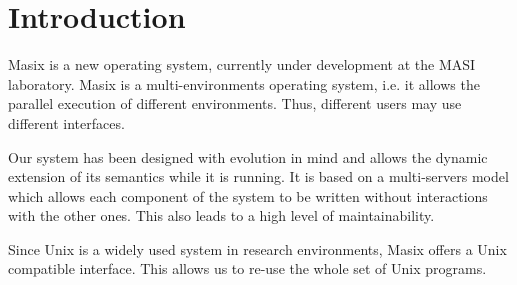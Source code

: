 \begin {abstract}

	Traditional operating systems have been designed as a monolithic
kernel implementing the whole set of the system services. This approach leads
to important maintenance end evolution problems. This paper discusses a new
design methodology. The operating system is implemented as a set of servers
using the services provided by a micro-kernel. Splitting up the operating
system into a set of servers leads to a modular and evolutive structure. The
system exposed in this paper is made up of three layers. The first one, the
host system, provides services which allow the dynamic inclusion of new servers
and different user interfaces. The second one, the Unix environment, contains
a set of servers which provide Unix abstractions and semantics. It is based
on new and optimized implementations, using the Mach micro-kernel facilities.
The third layer, the virtual system, is made up of a set of servers providing
distributed features. These servers are dynamically included in the system by
using the host system services. Numerous improvements included in the system
imply performance optimizations in spite of context switches and messages
exchanges needed to make different servers communicate with each others. The
resulting structure is innovative and easy to extend. This system is the basis
for future distributed operating system researches.

\end {abstract}

\section* {Introduction}

	Masix is a new operating system, currently under development at the
MASI laboratory. Masix is a multi-environments operating system, i.e. it allows
the parallel execution of different environments. Thus, different users may
use different interfaces.

	Our system has been designed with evolution in mind and allows the
dynamic extension of its semantics while it is running. It is based on a
multi-servers model which allows each component of the system to be written
without interactions with the other ones. This also leads to a high level
of maintainability.

	Since Unix is a widely used system in research environments, Masix
offers a Unix compatible interface. This allows us to re-use the whole
set of Unix programs.

